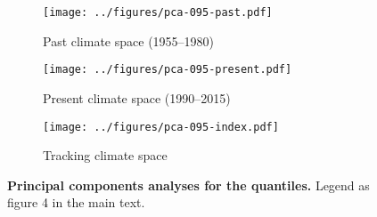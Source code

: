 \documentclass[12pt]{report}
\begin{document}
\begin{figure}[h!]
  \begin{center}
    \begin{subfigure}{.45\textwidth}
      \texttt{[image: ../figures/pca-095-past.pdf]}
      \caption{Past climate space (1955--1980)}
    \end{subfigure}
    \begin{subfigure}{.45\textwidth}
      \texttt{[image: ../figures/pca-095-present.pdf]}
      \caption{Present climate space (1990--2015)}
    \end{subfigure}
    \begin{subfigure}{.45\textwidth}
      \texttt{[image: ../figures/pca-095-index.pdf]}
      \caption{Tracking climate space}
    \end{subfigure}
  \end{center}
  \caption{\doublespacing \textbf{Principal components analyses for
      the  quantiles.} Legend as figure 4 in the main text.}
  \label{pca}
\end{figure}
\end{document}
